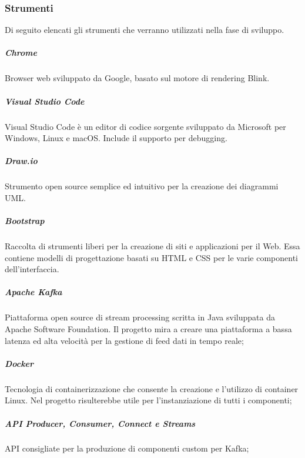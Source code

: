		\subsubsection{Strumenti}
			Di seguito elencati gli strumenti che verranno utilizzati nella fase di sviluppo.
				\subparagraph{Chrome}
					Browser web sviluppato da Google, basato sul motore di rendering Blink.
				\subparagraph{Visual Studio Code}
					Visual Studio Code è un editor di codice sorgente sviluppato da Microsoft per Windows, Linux e macOS. Include il supporto per debugging.
				\subparagraph{Draw.io}
					Strumento open source semplice ed  intuitivo per la creazione dei diagrammi UML.
				\subparagraph{Bootstrap}
					Raccolta di strumenti liberi per la creazione di siti e applicazioni per il Web. Essa contiene modelli di progettazione basati su HTML e CSS per le varie componenti dell'interfaccia.
				\subparagraph{Apache Kafka}
					Piattaforma open source di stream processing scritta in Java sviluppata da Apache Software Foundation. Il progetto mira a creare una piattaforma a bassa latenza ed alta velocità per la gestione di feed dati in tempo reale;
				\subparagraph{Docker}
					Tecnologia di containerizzazione che consente la creazione e l'utilizzo di container Linux. Nel progetto risulterebbe utile per l'instanziazione di tutti i componenti;   
				\subparagraph{API Producer, Consumer, Connect e Streams}	
					API consigliate per la produzione di componenti custom per Kafka;

			